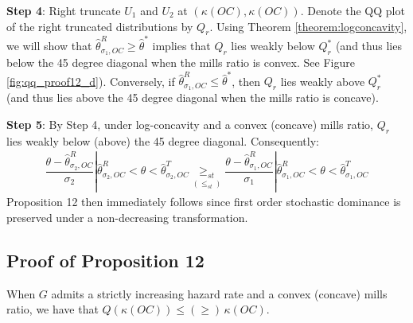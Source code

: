 \noindent \textbf{Step 4}: Right truncate $U_1$ and $U_2$ at $(\kappa(OC),\kappa(OC))$. Denote the QQ plot of the right truncated distributions by $Q_r$. Using Theorem \ref{theorem:logconcavity}, we will show that $\hat{\theta}^{R}_{\sigma_1,OC}\geq \hat{\theta}^*$ implies that $Q_r$ lies weakly below $Q_r^*$ (and thus lies below the 45 degree diagonal when the mills ratio is convex. See Figure \ref{fig:qq_proof12_d}). Conversely, if $\hat{\theta}^{R}_{\sigma_1,OC}\leq \hat{\theta}^*$, then $Q_r$ lies weakly above $Q_r^*$ (and thus lies above the 45 degree diagonal when the mills ratio is concave). 

\noindent \textbf{Step 5}: By Step 4, under log-concavity and a convex (concave) mills ratio, $Q_r$ lies weakly below (above) the 45 degree diagonal. Consequently:
\begin{align*}
    \dfrac{\theta - \hat{\theta}^R_{\sigma_2,OC}}{\sigma_2}|\hat{\theta}^R_{\sigma_2,OC}<\theta < \hat{\theta}^T_{\sigma_2,OC} \underset{(\leq_{st})}{\geq_{st}} \dfrac{\theta - \hat{\theta}^R_{\sigma_1,OC}}{\sigma_1}|\hat{\theta}^R_{\sigma_1,OC}<\theta < \hat{\theta}^T_{\sigma_1,OC} 
\end{align*}
Proposition 12 then immediately follows since first order stochastic dominance is preserved under a non-decreasing transformation. 

\subsection{Proof of Proposition 12}

\begin{lemma}[Step 1]\label{lemma:step1} When $G$ admits a strictly increasing hazard rate and a convex (concave) mills ratio, we have that $Q(\kappa(OC))\leq (\geq)\, \kappa(OC)$. 
\end{lemma}

